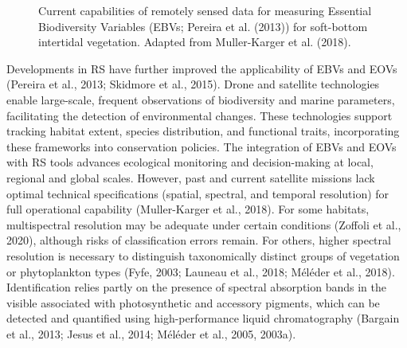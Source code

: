 \documentclass[
  letterpaper,
  11pt,
  english,
  singlespacing,
  headsepline]{MastersDoctoralThesis}
\begin{document}
\begin{spacing}{1.5}
\begin{figure}


\caption{\label{fig-MullerKarger}Current capabilities of remotely sensed
data for measuring Essential Biodiversity Variables (EBVs; Pereira et
al. (2013)) for soft-bottom intertidal vegetation. Adapted from
Muller-Karger et al. (2018).}

\end{figure}%

Developments in RS have further improved the applicability of EBVs and
EOVs (Pereira et al., 2013; Skidmore et al., 2015). Drone and satellite
technologies enable large-scale, frequent observations of biodiversity
and marine parameters, facilitating the detection of environmental
changes. These technologies support tracking habitat extent, species
distribution, and functional traits, incorporating these frameworks into
conservation policies. The integration of EBVs and EOVs with RS tools
advances ecological monitoring and decision-making at local, regional
and global scales. However, past and current satellite missions lack
optimal technical specifications (spatial, spectral, and temporal
resolution) for full operational capability (Muller-Karger et al.,
2018). For some habitats, multispectral resolution may be adequate under
certain conditions (Zoffoli et al., 2020), although risks of
classification errors remain. For others, higher spectral resolution is
necessary to distinguish taxonomically distinct groups of vegetation or
phytoplankton types (Fyfe, 2003; Launeau et al., 2018; Méléder et al.,
2018). Identification relies partly on the presence of spectral
absorption bands in the visible associated with photosynthetic and
accessory pigments, which can be detected and quantified using
high-performance liquid chromatography (Bargain et al., 2013; Jesus et
al., 2014; Méléder et al., 2005, 2003a).


\end{spacing}
\end{document}
